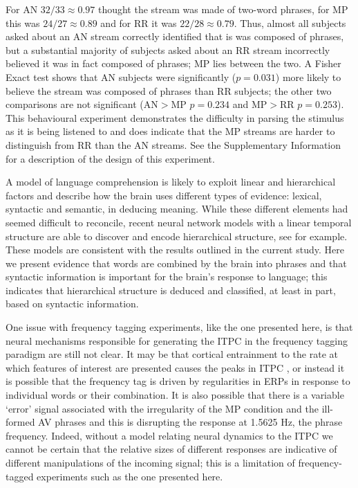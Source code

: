 \documentclass[10pt,letterpaper]{article}
\newcommand{\citet}[1]{\cite{#1}}
\begin{document}
For AN $32/33\approx 0.97$ thought the stream was made of two-word
phrases, for MP this was $24/27\approx 0.89$ and for RR it was
$22/28\approx 0.79$. Thus, almost all subjects asked about an AN
stream correctly identified that is was composed of phrases, but a
substantial majority of subjects asked about an RR stream incorrectly
believed it was in fact composed of phrases; MP lies between the
two. A Fisher Exact test shows that AN subjects were significantly
($p=0.031$) more likely to believe the stream was composed of phrases
than RR subjects; the other two comparisons are not significant
(AN$>$MP $p=0.234$ and MP$>$RR $p=0.253$). This behavioural experiment
demonstrates the difficulty in parsing the stimulus as it is being
listened to and does indicate that the MP streams are harder to
distinguish from RR than the AN streams. See the Supplementary
Information for a description of the design of this experiment.

A model of language comprehension is likely to exploit linear and
hierarchical factors and describe how the brain uses different types
of evidence: lexical, syntactic and semantic, in deducing
meaning. While these different elements had seemed difficult to
reconcile, recent neural network models with a linear temporal
structure are able to discover and encode hierarchical structure, see
\citet{LakretzEtAl2019,Baroni2019} for example. These models are
consistent with the results outlined in the current study. Here we
present evidence that words are combined by the brain into phrases and
that syntactic information is important for the brain's response to
language; this indicates that hierarchical structure is deduced and
classified, at least in part, based on syntactic information.

One issue with frequency tagging experiments, like the one presented
here, is that neural mechanisms responsible for generating the ITPC in
the frequency tagging paradigm are still not clear. It may be that
cortical entrainment to the rate at which features of interest are
presented causes the peaks in ITPC \cite{Meyer2018}, or instead it is
possible that the frequency tag is driven by regularities in ERPs in
response to individual words or their combination. It is also possible
that there is a variable `error' signal associated with the
irregularity of the MP condition and the ill-formed AV phrases and
this is disrupting the response at 1.5625 Hz, the phrase
frequency. Indeed, without a model relating neural dynamics to the
ITPC we cannot be certain that the relative sizes of different
responses are indicative of different manipulations of the incoming
signal; this is a limitation of frequency-tagged experiments such as
the one presented here.
\end{document}

